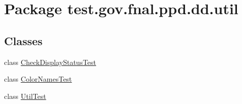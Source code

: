 \hypertarget{namespacetest_1_1gov_1_1fnal_1_1ppd_1_1dd_1_1util}{\section{Package test.\-gov.\-fnal.\-ppd.\-dd.\-util}
\label{namespacetest_1_1gov_1_1fnal_1_1ppd_1_1dd_1_1util}
}
\subsection*{Classes}
\begin{DoxyCompactItemize}
\item 
class \hyperlink{classtest_1_1gov_1_1fnal_1_1ppd_1_1dd_1_1util_1_1CheckDisplayStatusTest}{Check\-Display\-Status\-Test}
\item 
class \hyperlink{classtest_1_1gov_1_1fnal_1_1ppd_1_1dd_1_1util_1_1ColorNamesTest}{Color\-Names\-Test}
\item 
class \hyperlink{classtest_1_1gov_1_1fnal_1_1ppd_1_1dd_1_1util_1_1UtilTest}{Util\-Test}
\end{DoxyCompactItemize}
